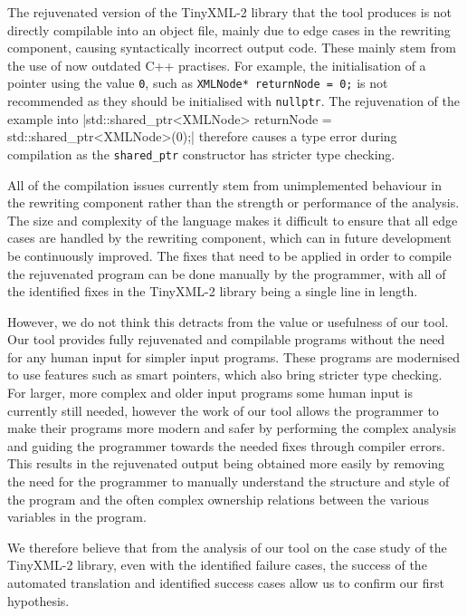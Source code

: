 \documentclass{mpaper}
\begin{document}
    The rejuvenated version of the TinyXML-2 library that the tool produces is not directly compilable into an object file, mainly due to edge cases in the rewriting component, causing syntactically incorrect output code.
    These mainly stem from the use of now outdated C++ practises.
    For example, the initialisation of a pointer using the value \texttt{0}, such as
    \texttt{XMLNode* returnNode = 0;} is not recommended as they should be initialised with \texttt{nullptr}.
    The rejuvenation of the example into
    |std::shared_ptr<XMLNode>  returnNode = std::shared_ptr<XMLNode>(0);|
    therefore causes a type error during compilation as the \texttt{shared_ptr} constructor has stricter type checking. 
    
    All of the compilation issues currently stem from unimplemented behaviour in the rewriting component rather than the strength or performance of the analysis.
    The size and complexity of the language makes it difficult to ensure that all edge cases are handled by the rewriting component, which can in future development be continuously improved.
    The fixes that need to be applied in order to compile the rejuvenated program can be done manually by the programmer, with all of the identified fixes in the TinyXML-2 library being a single line in length. 
    
    However, we do not think this detracts from the value or usefulness of our tool.
    Our tool provides fully rejuvenated and compilable programs without the need for any human input for simpler input programs. 
    These programs are modernised to use features such as smart pointers, which also bring stricter type checking.
    For larger, more complex and older input programs some human input is currently still needed, however the work of our tool allows the programmer to make their programs more modern and safer by performing the complex analysis and guiding the programmer towards the needed fixes through compiler errors.
    This results in the rejuvenated output being obtained more easily by removing the need for the programmer to manually understand the structure and style of the program and the often complex ownership relations between the various variables in the program. 
    
    We therefore believe that from the analysis of our tool on the case study of the TinyXML-2 library, even with the identified failure cases, the success of the automated translation and identified success cases allow us to confirm our first hypothesis.
    
\end{document}
